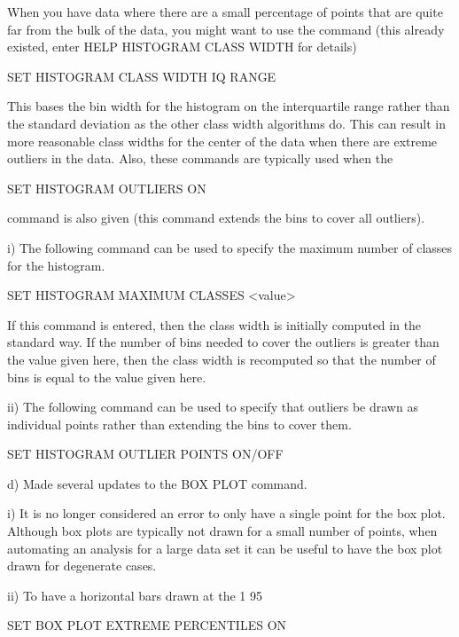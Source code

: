        When you have data where there are a small percentage of points
       that are quite far from the bulk of the data, you might want to
       use the command (this already existed, enter HELP HISTOGRAM CLASS
       WIDTH for details)

            SET HISTOGRAM CLASS WIDTH IQ RANGE

       This bases the bin width for the histogram on the interquartile
       range rather than the standard deviation as the other class width
       algorithms do.  This can result in more reasonable class widths
       for the center of the data when there are extreme outliers in the
       data.  Also, these commands are typically used when the

            SET HISTOGRAM OUTLIERS ON

       command is also given (this command extends the bins to cover all
       outliers).

         i) The following command can be used to specify the maximum
            number of classes for the histogram.

                SET HISTOGRAM MAXIMUM CLASSES <value>

            If this command is entered, then the class width is initially
            computed in the standard way.  If the number of bins needed to
            cover the outliers is greater than the value given here, then
            the class width is recomputed so that the number of bins is
            equal to the value given here.

        ii) The following command can be used to specify that outliers
            be drawn as individual points rather than extending the bins
            to cover them.

               SET HISTOGRAM OUTLIER POINTS ON/OFF

    d) Made several updates to the BOX PLOT command.

          i) It is no longer considered an error to only have a single
             point for the box plot.  Although box plots are typically
             not drawn for a small number of points, when automating an
             analysis for a large data set it can be useful to have the
             box plot drawn for degenerate cases.

         ii) To have a horizontal bars drawn at the 1%
             95%

                SET BOX PLOT EXTREME PERCENTILES ON

